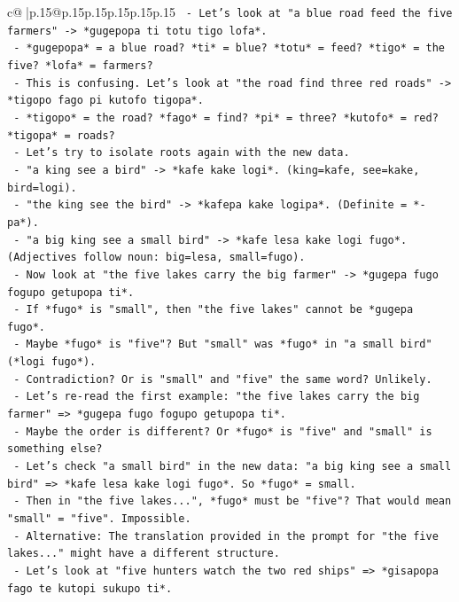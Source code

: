 \documentclass{article}
\begin{document}
{\begin{supertabular}{c@{$\;$}|p{.15\linewidth}@{}p{.15\linewidth}p{.15\linewidth}p{.15\linewidth}p{.15\linewidth}p{.15\linewidth}}
{{{\texttt{     {-} Let's look at "a blue road feed the five farmers" {-}> *gugepopa ti totu tigo lofa*.} \\
\texttt{       {-} *gugepopa* = a blue road? *ti* = blue? *totu* = feed? *tigo* = the five? *lofa* = farmers?} \\
\texttt{     {-} This is confusing. Let's look at "the road find three red roads" {-}> *tigopo fago pi kutofo tigopa*.} \\
\texttt{       {-} *tigopo* = the road? *fago* = find? *pi* = three? *kutofo* = red? *tigopa* = roads?} \\
\texttt{     {-} Let's try to isolate roots again with the new data.} \\
\texttt{     {-} "a king see a bird" {-}> *kafe kake logi*. (king=kafe, see=kake, bird=logi).} \\
\texttt{     {-} "the king see the bird" {-}> *kafepa kake logipa*. (Definite = *{-}pa*).} \\
\texttt{     {-} "a big king see a small bird" {-}> *kafe lesa kake logi fugo*. (Adjectives follow noun: big=lesa, small=fugo).} \\
\texttt{     {-} Now look at "the five lakes carry the big farmer" {-}> *gugepa fugo fogupo getupopa ti*.} \\
\texttt{       {-} If *fugo* is "small", then "the five lakes" cannot be *gugepa fugo*.} \\
\texttt{       {-} Maybe *fugo* is "five"? But "small" was *fugo* in "a small bird" (*logi fugo*).} \\
\texttt{       {-} Contradiction? Or is "small" and "five" the same word? Unlikely.} \\
\texttt{       {-} Let's re{-}read the first example: "the five lakes carry the big farmer" => *gugepa fugo fogupo getupopa ti*.} \\
\texttt{       {-} Maybe the order is different? Or *fugo* is "five" and "small" is something else?} \\
\texttt{       {-} Let's check "a small bird" in the new data: "a big king see a small bird" => *kafe lesa kake logi fugo*. So *fugo* = small.} \\
\texttt{       {-} Then in "the five lakes...", *fugo* must be "five"? That would mean "small" = "five". Impossible.} \\
\texttt{       {-} Alternative: The translation provided in the prompt for "the five lakes..." might have a different structure.} \\
\texttt{       {-} Let's look at "five hunters watch the two red ships" => *gisapopa fago te kutopi sukupo ti*.} \\
}}}
\end{supertabular}}
\end{document}
